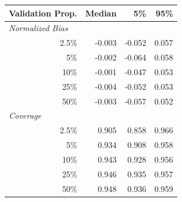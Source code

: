 
\begin{tabular}{r|rrr}
\toprule
Validation Prop. & Median & 5\% & 95\%\\
\midrule
\multicolumn{1}{l|}{\textit{Normalized Bias}}\\
2.5\% & -0.003 & -0.052 & 0.057\\
5\% & -0.002 & -0.064 & 0.058\\
10\% & -0.001 & -0.047 & 0.053\\
25\% & -0.004 & -0.052 & 0.053\\
50\% & -0.003 & -0.057 & 0.052\\
\midrule
%
\multicolumn{1}{l|}{\textit{Coverage}}\\
2.5\% & 0.905 & 0.858 & 0.966\\
5\% & 0.934 & 0.908 & 0.958\\
10\% & 0.943 & 0.928 & 0.956\\
25\% & 0.946 & 0.935 & 0.957\\
50\% & 0.948 & 0.936 & 0.959\\
\bottomrule
\end{tabular}
